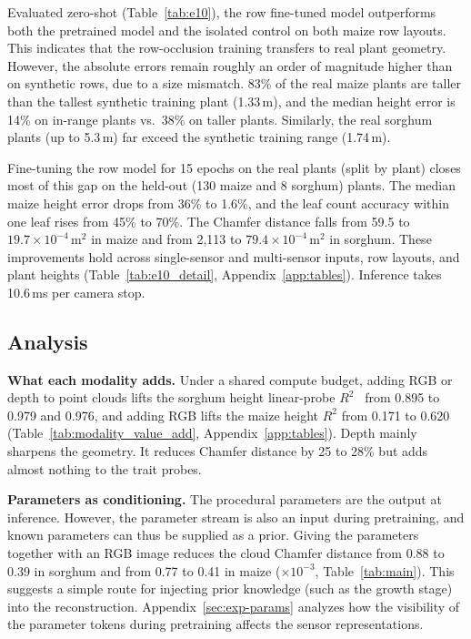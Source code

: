 \documentclass[10pt,twocolumn,letterpaper]{article}
\begin{document}
Evaluated zero-shot (Table~\ref{tab:e10}), the row fine-tuned model outperforms both the pretrained model and the isolated control on both maize row layouts. This indicates that the row-occlusion training transfers to real plant geometry. However, the absolute errors remain roughly an order of magnitude higher than on synthetic rows, due to a size mismatch. 83\% of the real maize plants are taller than the tallest synthetic training plant (1.33\,m), and the median height error is 14\% on in-range plants vs.\ 38\% on taller plants. Similarly, the real sorghum plants (up to 5.3\,m) far exceed the synthetic training range (1.74\,m).


Fine-tuning the row model for 15 epochs on the real plants (split by plant) closes most of this gap on the held-out (130 maize and 8 sorghum) plants. The median maize height error drops from 36\% to 1.6\%, and the leaf count accuracy within one leaf rises from 45\% to 70\%. The Chamfer distance falls from 59.5 to $19.7 \times 10^{-4}\,\mathrm{m}^2$ in maize and from 2{,}113 to $79.4 \times 10^{-4}\,\mathrm{m}^2$ in sorghum. These improvements hold across single-sensor and multi-sensor inputs, row layouts, and plant heights (Table~\ref{tab:e10_detail}, Appendix~\ref{app:tables}). Inference takes 10.6\,ms per camera stop. %

\subsection{Analysis}
\label{sec:exp-analysis}

\noindent\textbf{What each modality adds.}
Under a shared compute budget, adding RGB or depth to point clouds lifts the sorghum height linear-probe $R^2$~\citep{chen2020simclr} from 0.895 to 0.979 and 0.976, and adding RGB lifts the maize height $R^2$ from 0.171 to 0.620 (Table~\ref{tab:modality_value_add}, Appendix~\ref{app:tables}). Depth mainly sharpens the geometry. It reduces Chamfer distance by 25 to 28\% but adds almost nothing to the trait probes.

\noindent\textbf{Parameters as conditioning.}
The procedural parameters are the output at inference. However, the parameter stream is also an input during pretraining, and known parameters can thus be supplied as a prior. Giving the parameters together with an RGB image reduces the cloud Chamfer distance from 0.88 to 0.39 in sorghum and from 0.77 to 0.41 in maize ($\times 10^{-3}$, Table~\ref{tab:main}). This suggests a simple route for injecting prior knowledge (such as the growth stage) into the reconstruction. Appendix~\ref{sec:exp-params} analyzes how the visibility of the parameter tokens during pretraining affects the sensor representations.
\end{document}
